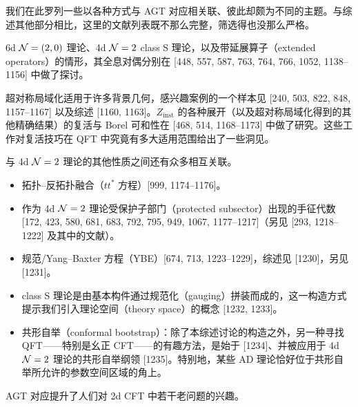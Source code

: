 我们在此罗列一些以各种方式与 AGT 对应相关联、彼此却颇为不同的主题。与综述其他部分相比，这里的文献列表既不那么完整，筛选得也没那么严格。

6d $\mathcal{N}=(2,0)$ 理论、4d $\mathcal{N}=2$ class S 理论，以及带延展算子（extended operators）的情形，其全息对偶分别在 [448, 557, 587, 763, 764, 766, 1052, 1138--1156] 中做了探讨。

超对称局域化适用于许多背景几何，感兴趣案例的一个样本见 [240, 503, 822, 848, 1157--1167] 以及综述 [1160, 1163]。$Z_{\mathrm{inst}}$ 的各种展开（以及超对称局域化得到的其他精确结果）的复活与 Borel 可和性在 [468, 514, 1168--1173] 中做了研究。这些工作对复活技巧在 QFT 中究竟有多大适用范围给出了一些洞见。

与 4d $\mathcal{N}=2$ 理论的其他性质之间还有众多相互关联。

\begin{itemize}[leftmargin=1.4em,itemsep=3pt,topsep=3pt]
  \item 拓扑--反拓扑融合（$tt^*$ 方程）[999, 1174--1176]。


  \item 作为 4d $\mathcal{N}=2$ 理论受保护子部门（protected subsector）出现的手征代数 [172, 423, 580, 681, 683, 792, 795, 949, 1067, 1177--1217]（另见 [293, 1218--1222] 及其中的文献）。

  \item 规范/Yang--Baxter 方程（YBE）[674, 713, 1223--1229]，综述见 [1230]，另见 [1231]。
  \item class S 理论是由基本构件通过规范化（gauging）拼装而成的，这一构造方式提示我们引入理论空间（theory space）的概念 [1232, 1233]。
  \item 共形自举（conformal bootstrap）：除了本综述讨论的构造之外，另一种寻找 QFT------特别是幺正 CFT------的有趣方法，是始于 [1234]、并被应用于 4d $\mathcal{N}=2$ 理论的共形自举纲领 [1235]。特别地，某些 AD 理论恰好位于共形自举所允许的参数空间区域的角上。
\end{itemize}

AGT 对应提升了人们对 2d CFT 中若干老问题的兴趣。


